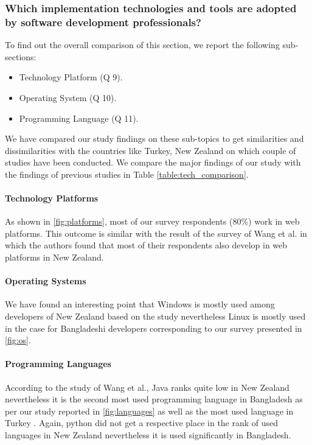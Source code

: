 \subsubsection{Which implementation technologies and tools are adopted by software development professionals?}

To find out the overall comparison of this section, we report the following sub-sections:
\begin{itemize}
\item Technology Platform (Q 9).
\item Operating System (Q 10).
\item Programming Language (Q 11).
\end{itemize}

We have compared our study findings on these sub-topics to get similarities and dissimilarities with the countries like Turkey, New Zealand on which couple of studies have been conducted. We compare the major findings of our study with the findings of previous studies in Table \ref{table:tech_comparison}.



\paragraph{Technology Platforms}
As shown in \ref{fig:platforms}, most of our survey respondents (80\%) work in web platforms. This outcome is similar with the result of the survey of Wang et al. \cite{Wang2018} in which the authors found that most of their respondents also develop in web platforms in New Zealand.


\paragraph{Operating Systems}
We have found an interesting point that Windows is mostly used among developers of New Zealand based on the study \cite{Wang2018} nevertheless Linux is mostly used in the case for Bangladeshi developers corresponding to our survey presented in \ref{fig:os}.


\paragraph{Programming Languages}
According to the study of Wang et al.\cite{Wang2018}, Java ranks quite low in New Zealand nevertheless it is the second most used programming language in Bangladesh as per our study reported in \ref{fig:languages} as well as the most used language in Turkey \cite{Garousi2015}. Again, python did not get a respective place in the rank of used languages in New Zealand nevertheless it is used significantly in Bangladesh.
